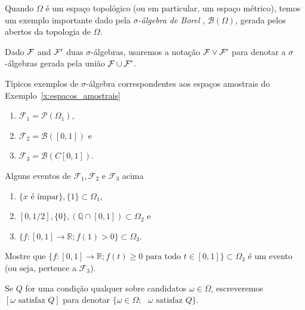 \documentclass[../main/Notas_de_aula.tex]{subfiles}
\begin{document}
\begin{definition}
  Quando $\Omega$ é um espaço topológico (ou em particular, um espaço métrico), temos um exemplo importante dado pela \emph{$\sigma$-álgebra de Borel} , $\mathcal{B}(\Omega)$, gerada pelos abertos da topologia de $\Omega$.
\end{definition}

\medskip


Dado ${\mathcal F}$ and ${\mathcal F}'$ duas $\sigma$-álgebras, usaremos a notação ${\mathcal F}\vee{\ensuremath{\mathcal F}}'$ para denotar
a $\sigma$-álgebras gerada pela união ${\mathcal F}\cup{\ensuremath{\mathcal F}}'$.

\begin{example} Típicos exemplos de $\sigma$-álgebra correspondentes aos espaços amostrais do Exemplo~\ref{x:espacos_amostrais}
  \begin{enumerate}[\quad a)]
  \item $\mathcal{F}_1 = \mathcal{P}(\Omega_1)$,
  \item $\mathcal{F}_2 = \mathcal{B}([0,1])$ e
  \item $\mathcal{F}_3 = \mathcal{B}(C[0,1])$.
  \end{enumerate}
\end{example}

\begin{example} Alguns eventos de $\mathcal{F}_1, \mathcal{F}_2$ e $\mathcal{F}_3$ acima
  \begin{enumerate}[\quad a)]
  \item $\{\text{$x$ é ímpar}\}, \{1\} \subset \Omega_1$,
  \item $[0,1/2], \{0\}, (\mathbb{Q} \cap [0,1]) \subset \Omega_2$ e
  \item $\{f:[0,1] \to \mathbb{R}; f(1) > 0\} \subset \Omega_3$.
  \end{enumerate}
\end{example}

\begin{exercise}
  Mostre que $\{f:[0,1] \to \mathbb{R}; f(t) \geq 0 \text{ para todo $t \in [0,1]$}\} \subset \Omega_3$ é um evento (ou seja, pertence a $\mathcal{F}_3$).
\end{exercise}

\begin{notation}
  Se $Q$ for uma condição qualquer sobre candidatos $\omega \in \Omega$, escreveremos $[\text{$\omega$ satisfaz $Q$}]$  para denotar $\{\omega \in \Omega; \text{ $\omega$ satisfaz $Q$}\}$.
\end{notation}
\end{document}
